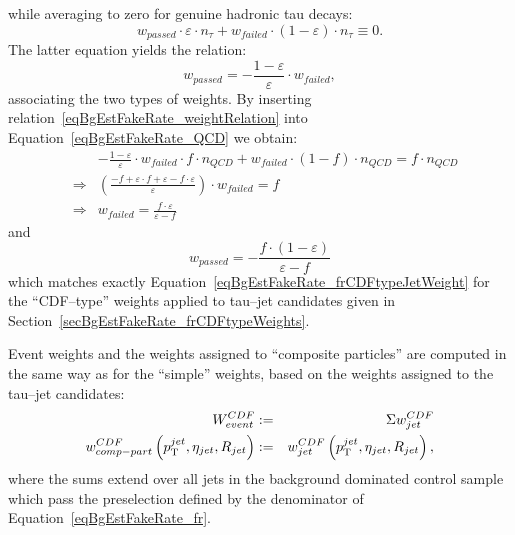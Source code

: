 while averaging to zero for genuine hadronic tau decays:
\begin{equation*}
w_{passed} \cdot \varepsilon \cdot n_{\tau} + w_{failed} \cdot \left( 1 - \varepsilon \right) \cdot n_{\tau} \equiv 0.
\label{eqBgEstFakeRate_tau}
\end{equation*}
The latter equation yields the relation:
\begin{equation}
w_{passed} = -\frac{1 - \varepsilon}{\varepsilon} \cdot w_{failed},
\label{eqBgEstFakeRate_weightRelation}
\end{equation}
associating the two types of weights.  By inserting
relation~\ref{eqBgEstFakeRate_weightRelation} into
Equation~\ref{eqBgEstFakeRate_QCD} we obtain:
\begin{eqnarray*}
& & -\frac{1 - \varepsilon}{\varepsilon} \cdot w_{failed} \cdot f \cdot n_{QCD} + w_{failed} \cdot \left( 1 - f \right) \cdot n_{QCD} 
 = f \cdot n_{QCD} \\
& \Rightarrow & \left( \frac{-f + \varepsilon \cdot f + \varepsilon - f \cdot \varepsilon}{\varepsilon} \right) \cdot w_{failed} = f \\
& \Rightarrow & w_{failed} = \frac{f \cdot \varepsilon}{\varepsilon - f} 
\end{eqnarray*}
and 
\begin{equation}
w_{passed} = -\frac{f \cdot \left( 1 - \varepsilon \right)}{\varepsilon - f}
\end{equation}
which matches exactly Equation~\ref{eqBgEstFakeRate_frCDFtypeJetWeight} for the
``CDF--type'' weights applied to tau--jet candidates given in
Section~\ref{secBgEstFakeRate_frCDFtypeWeights}.

Event weights and the weights assigned to ``composite particles'' 
are computed in the same way as for the ``simple'' weights,
based on the weights assigned to the tau--jet candidates:
\begin{eqnarray}
W_{event}^{CDF} & := & \Sigma w_{jet}^{CDF} \nonumber \\
w_{comp-part}^{CDF} \left( p_{\mathrm{T}}^{jet}, \eta_{jet}, R_{jet} \right) & := & 
  w_{jet}^{CDF} \left( p_{\mathrm{T}}^{jet}, \eta_{jet}, R_{jet} \right),
\label{eqBgEstFakeRate_frCDFtypeEvent_and_CompositeParticleWeight}
\end{eqnarray}
where the sums extend over all jets in the background dominated control sample
which pass the preselection defined by the denominator of
Equation~\ref{eqBgEstFakeRate_fr}.

